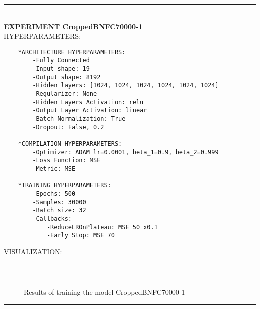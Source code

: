 \rule{0.5\textwidth}{0.5pt}\\

	{\large \textbf{EXPERIMENT CroppedBNFC70000-1}}\\
	
	{\normalsize HYPERPARAMETERS:}
	\begin{lstlisting}	
	*ARCHITECTURE HYPERPARAMETERS:
		-Fully Connected
		-Input shape: 19
		-Output shape: 8192
		-Hidden layers: [1024, 1024, 1024, 1024, 1024, 1024]
		-Regularizer: None
		-Hidden Layers Activation: relu
		-Output Layer Activation: linear
		-Batch Normalization: True
		-Dropout: False, 0.2
	
	*COMPILATION HYPERPARAMETERS:
		-Optimizer: ADAM lr=0.0001, beta_1=0.9, beta_2=0.999
		-Loss Function: MSE
		-Metric: MSE
	
	*TRAINING HYPERPARAMETERS:
		-Epochs: 500
		-Samples: 30000
		-Batch size: 32
		-Callbacks: 
			-ReduceLROnPlateau: MSE 50 x0.1
			-Early Stop: MSE 70
	\end{lstlisting}
	
	{\normalsize VISUALIZATION:}
	\begin{lstlisting}
	\end{lstlisting}
	
	\begin{figure*}[ht!]
		\hspace{\fill}
		\hspace{\fill}
		\\
		\caption{Results of training the model CroppedBNFC70000-1}
	\end{figure*}
	
\FloatBarrier	
\rule{0.5\textwidth}{0.5pt}\\